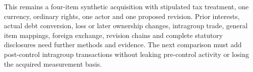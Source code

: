 This remains a four-item synthetic acquisition with stipulated tax treatment, one currency, ordinary rights, one actor and one proposed revision. Prior interests, actual debt conversion, loss or later ownership changes, intragroup trade, general item mappings, foreign exchange, revision chains and complete statutory disclosures need further methods and evidence. The next comparison must add post-control intragroup transactions without leaking pre-control activity or losing the acquired measurement basis.
